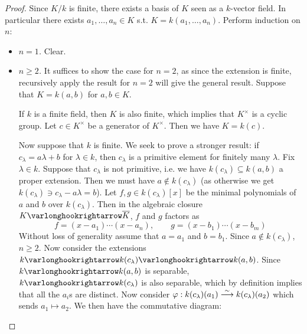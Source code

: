 \documentclass{article}
\begin{document}
\begin{proof}
    Since $K/k$ is finite, there exists a basis of $K$ seen as a $k$-vector field. In particular there exists $a_1, \dots, a_n \in K$ s.t. $K = k(a_1, \dots, a_n)$. Perform induction on $n$:
    \begin{itemize}
        \item \emph{$n = 1$.} Clear.
        \item \emph{$n \geq 2$.} It suffices to show the case for $n = 2$, as since the extension is finite, recursively apply the result for $n = 2$ will give the general result. Suppose that $K = k(a, b)$ for $a, b \in K$. 
        
        If $k$ is a finite field, then $K$ is also finite, which implies that $K^{\times}$ is a cyclic group. Let $c \in K^{\times}$ be a generator of $K^{\times}$. Then we have $K = k(c)$.

        Now suppose that $k$ is finite. We seek to prove a stronger result: if $c_{\lambda} = a \lambda + b$ for $\lambda \in k$, then $c_{\lambda}$ is a primitive element for finitely many $\lambda$. Fix $\lambda \in k$. Suppose that $c_{\lambda}$ is not primitive, i.e. we have $k(c_{\lambda}) \subseteq k(a, b)$ a proper extension. Then we must have $a \notin k(c_{\lambda})$ (as otherwise we get $k(c_{\lambda}) \ni c_{\lambda} - a\lambda = b$). Let $f, g \in k(c_{\lambda})[x]$ be the minimal polynomials of $a$ and $b$ over $k(c_{\lambda})$. Then in the algebraic closure $K \ext \overline{K}$, $f$ and $g$ factors as 
        \[
            f = (x - a_1) \cdots (x - a_n), \qquad g = (x - b_1) \cdots (x - b_m)
        \]
        Without loss of generality assume that $a = a_1$ and $b = b_1$. Since $a \notin k(c_{\lambda})$, $n \geq 2$. Now consider the extensions $k \ext k(c_{\lambda}) \ext k(a, b)$. Since $k \ext k(a, b)$ is separable, $k \ext k(c_{\lambda})$ is also separable, which by definition implies that all the $a_i$s are distinct. Now consider $\varphi: k(c_{\lambda})(a_1) \overset{\sim}{\longrightarrow} k(c_{\lambda})(a_2)$ which sends $a_1 \mapsto a_2$. We then have the commutative diagram:


\end{itemize}
\end{proof}
\end{document}
